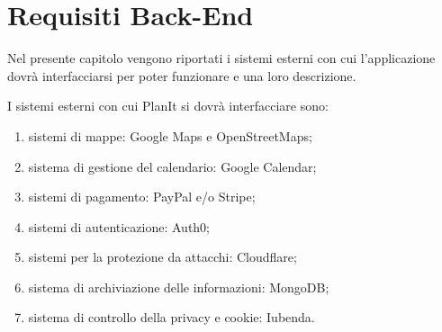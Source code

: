 \section{Requisiti Back-End}
\label{sec:RequisitiBackEnd}

Nel presente capitolo vengono riportati i sistemi esterni con cui l'applicazione dovrà interfacciarsi per poter funzionare e una loro descrizione.

I sistemi esterni con cui PlanIt si dovrà interfacciare sono:
\begin{enumerate}
    \item sistemi di mappe: Google Maps e OpenStreetMaps;
    \item sistema di gestione del calendario: Google Calendar;
    \item sistemi di pagamento: PayPal e/o Stripe;
    \item sistemi di autenticazione: Auth0;
    \item sistemi per la protezione da attacchi: Cloudflare;
    \item sistema di archiviazione delle informazioni: MongoDB;
    \item sistema di controllo della privacy e cookie: Iubenda.
\end{enumerate}

